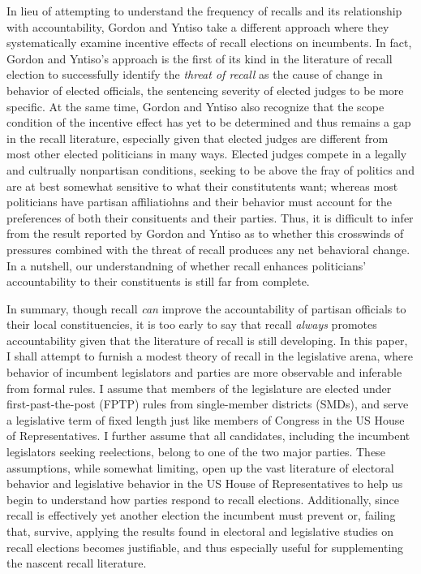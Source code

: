 \documentclass{article}
\begin{document}
		In lieu of attempting to understand the frequency of recalls and its relationship with accountability,
		Gordon and Yntiso \autocite*{gordonIncentiveEffectsRecall2021a}
		take a different approach
		where they systematically examine
		incentive effects of recall elections on incumbents.
		In fact,
		Gordon and Yntiso's approach is the first of its kind in the literature of recall election
		to
		successfully identify the \textit{threat of recall}
		as the cause of change in behavior of elected officials, 
		the sentencing severity of elected judges to be more specific.
		At the same time,
		Gordon and Yntiso \autocite*{gordonIncentiveEffectsRecall2021a} also recognize that the scope condition of the incentive effect has yet to be determined
		and thus remains a gap in the recall literature,
		especially given that elected judges are different from most other elected politicians in many ways.
		Elected judges compete in a legally and cultrually nonpartisan conditions,
		seeking to be above the fray of politics and are at best somewhat sensitive to what their constitutents want;
		whereas most politicians have partisan affiliatiohns
		and their behavior must account for the preferences of both their consituents and their parties.
		Thus, it is difficult to infer from the result reported by
		Gordon and Yntiso \autocite*{gordonIncentiveEffectsRecall2021a}
		as to
		whether this crosswinds of pressures combined with the threat of recall
		produces any net behavioral change.
		In a nutshell, our understandning of whether recall enhances
		politicians' accountability to their constituents
		is still far from complete.
		
		In summary, though recall \textit{can} improve
		the accountability of partisan officials to their local constituencies,
		it is too early to say that recall \textit{always} promotes accountability
		given that the literature of recall is still developing.
		In this paper,
		I shall attempt to furnish a modest theory of recall
		in the legislative arena,
		where behavior of
		incumbent legislators and parties
		are more observable and inferable from formal rules.
		I assume that members of the legislature
		are elected under first-past-the-post (FPTP) rules
		from single-member districts (SMDs),
		and serve a legislative term of fixed length
		just like members of Congress in the US House of Representatives.
		I further assume that all candidates,
		including the incumbent legislators seeking reelections,
		belong to one of the two major parties.
		These assumptions,
		while somewhat limiting,
		open up the vast literature of electoral behavior and legislative behavior in the US House of Representatives
		to help us begin to understand how parties respond to recall elections.
		Additionally,
		since recall is effectively yet another election
		the incumbent must prevent or, failing that, survive,
		applying the results found in
		electoral and legislative studies on recall elections
		becomes justifiable,
		and thus especially useful for supplementing the nascent recall literature.
\end{document}
